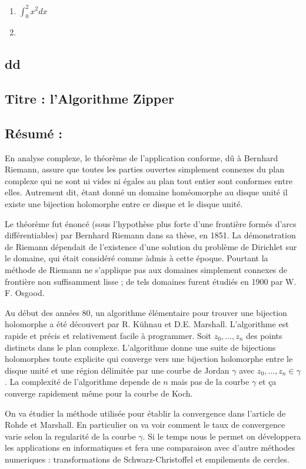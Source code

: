 \documentclass[]{article}
\date{}
\begin{document}
\begin{enumerate}
	\item $\int_0^2 x^2 {dx}$
	\item
\end{enumerate}
\subsection{dd}

\subsection{Titre : l'Algorithme Zipper}\label{titre-lalgorithme-zipper}

\subsection{Résumé :}\label{ruxe9sumuxe9}


En analyse complexe, le théorème de l'application conforme, dû à
Bernhard Riemann, assure que toutes les parties ouvertes simplement
connexes du plan complexe qui ne sont ni vides ni égales au plan tout
entier sont conformes entre elles. Autrement dit, étant donné un domaine
homéomorphe au disque unité il existe une bijection holomorphe entre ce
disque et le disque unité.

Le théorème fut énoncé (sous l'hypothèse plus forte d'une frontière
formés d'arcs différentiables) par Bernhard Riemann dans sa thèse, en
1851. La démonstration de Riemann dépendait de l'existence d'une
solution du problème de Dirichlet sur le domaine, qui était considéré
comme àdmis à cette époque. Pourtant la méthode de Riemann ne s'applique
pas aux domaines simplement connexes de frontière non suffisamment lisse
; de tels domaines furent étudiés en 1900 par W. F. Osgood.

Au début des années 80, un algorithme élémentaire pour trouver une
bijection holomorphe a été découvert par R. Kühnau et D.E. Marshall.
L'algorithme est rapide et précis et relativement facile à programmer.
Soit \(z_0, ..., z_n\) des points distincts dans le plan complexe.
L'algorithme donne une suite de bijections holomorphes toute explicite
qui converge vers une bijection holomorphe entre le disque unité et une
région délimitée par une courbe de Jordan \(\gamma\) avec
\(z_0, ..., z_n \in \gamma\). La complexité de l'algorithme depende de
\(n\) mais pas de la courbe \(\gamma\) et ça converge rapidement même
pour la courbe de Koch.

On va étudier la méthode utilisée pour établir la convergence dans
l'article de Rohde et Marshall. En particulier on va voir comment le
taux de convergence varie selon la regularité de la courbe \(\gamma\).
Si le temps nous le permet on développera les applications en
informatiques et fera une comparaison avec d'autre méthodes numeriques :
transformations de Schwarz-Christoffel et empilements de cercles.
\end{document}
